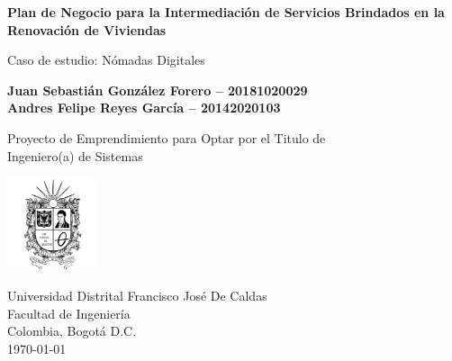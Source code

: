 \begin{titlepage}
    \begin{center}
        \vspace*{0.3cm}
            
        \Large
        \textbf{Plan de Negocio para la Intermediación de Servicios Brindados en la Renovación de Viviendas}   
        
        \vspace{0.5cm}
        \large
        Caso de estudio: Nómadas Digitales 
            
        \vspace{2.1cm}
            
        \normalsize
        \textbf{Juan Sebastián González Forero – 20181020029 }\\
        \textbf{Andres Felipe Reyes García – 20142020103}
            
        \vfill
            
        Proyecto de Emprendimiento para Optar por el Titulo de\\
        Ingeniero(a) de Sistemas
            
        \vspace{0.8cm}
            
        \includegraphics[width=0.2\textwidth]{Images/Escudo_UD}
            
        \large
        Universidad Distrital Francisco José De Caldas\\
        Facultad de Ingeniería\\
        Colombia, Bogotá D.C.\\
        \today
            
    \end{center}
\end{titlepage}